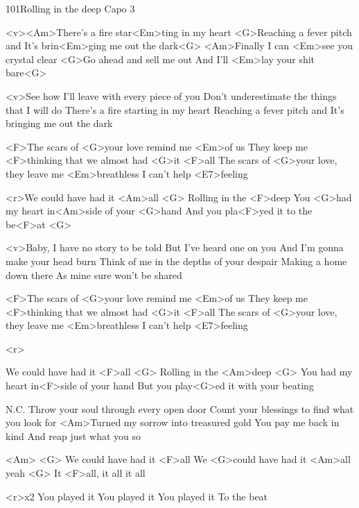 \begin{song}[Adele]{101}{Rolling in the deep}{}
Capo 3

<v><Am>There's a fire star<Em>ting in my heart
<G>Reaching a fever pitch and
It's brin<Em>ging me out the dark<G>
<Am>Finally I can <Em>see you crystal clear
<G>Go ahead and sell me out
And I'll <Em>lay your shit bare<G>

<v>See how I'll leave with every piece of you
Don't underestimate the things that I will do
There's a fire starting in my heart
Reaching a fever pitch and
It's bringing me out the dark

<F>The scars of <G>your love remind me <Em>of us
They keep me <F>thinking that we almost had <G>it <F>all
The scars of <G>your love, they leave me <Em>breathless
I can't help <E7>feeling

<r>We could have had it <Am>all <G>
Rolling in the <F>deep
You <G>had my heart in<Am>side of your <G>hand
And you pla<F>yed it to the be<F>at  <G>

<v>Baby, I have no story to be told
But I've heard one on you
And I'm gonna make your head burn
Think of me in the depths of your despair
Making a home down there
As mine sure won't be shared

<F>The scars of <G>your love remind me <Em>of us
They keep me <F>thinking that we almost had <G>it <F>all
The scars of <G>your love, they leave me <Em>breathless
I can't help <E7>feeling

<r>

We could have had it <F>all <G>
Rolling in the <Am>deep <G>
You had my heart in<F>side of your hand
But you play<G>ed it with your beating

N.C.
Throw your soul through every open door
Count your blessings to find what you look for
<Am>Turned my sorrow into treasured gold
You pay me back in kind
And reap just what you so

<Am> <G>
We could have had it <F>all
We <G>could have had it <Am>all yeah <G>
It <F>all, it all it all

<r>x2
You played it
You played it
You played it
To the beat
\end{song}
